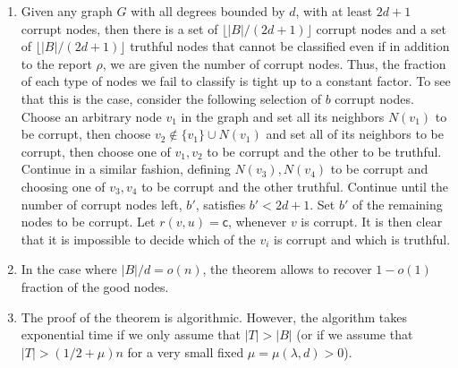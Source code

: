\documentclass{toc}
\begin{document}
\begin{enumerate}
\item Given any graph $G$ with all degrees bounded by $d$, with 
at least $2d+1$ corrupt nodes, then there is a set of 
 $\lfloor |B|/(2d+1) \rfloor$ corrupt nodes and a set of 
$\lfloor |B|/(2d+1) \rfloor$ truthful nodes
%
that  %
cannot be %
classified   %
even if in addition to the report $\rho$, we are given the number of 
corrupt nodes. Thus, the
%
fraction of each type of nodes 
we fail to classify is 
%
%
%
%
%
%
tight up to a constant factor. 
To see that this is the case, consider the following selection of $b$ 
%
%
%
corrupt nodes. Choose   %
an arbitrary node $v_1$ in the graph and set all its neighbors $N(v_1)$ to be corrupt, then choose $v_2 \notin \{ v_1 \} \cup N(v_1)$ and set all of its neighbors to be corrupt, then choose one of $v_1,v_2$ to be corrupt 
and the other to be truthful. Continue in a similar fashion, defining $N(v_3),N(v_4)$ to be corrupt and choosing one of $v_3,v_4$ to be corrupt and the other truthful. 
Continue until the number of corrupt nodes left, 
$b'$,   %
satisfies $b' < 2d+1$. 
%
%
Set $b'$ of the remaining nodes to be corrupt. 
%
 Let $r(v,u) = \mathsf{c}$, whenever $v$ is corrupt.  It is then clear that it is impossible to decide which of the $v_i$ is corrupt and which is truthful.
 
\item In the case where $|B|/d = o(n)$,  the theorem allows to recover 
$1-o(1)$ fraction of the good nodes. 

\item 
%
%
%
%
The proof of the theorem is algorithmic.  However,
the algorithm takes exponential time   %
if we only assume that $|T|>|B|$ (or if we assume that
$|T|>(1/2+\mu)n$ for a very small fixed $\mu=\mu(\lambda,d)>0$). 
\end{enumerate} 
\end{document}
